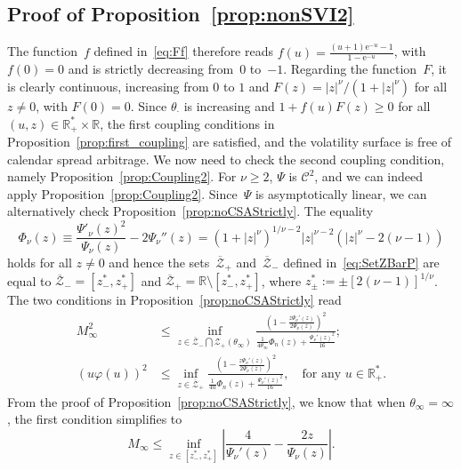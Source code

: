 \documentclass{amsart}[11pt]
\numberwithin{equation}{section}
\theoremstyle{definition}
\newcommand{\RR}{\mathbb{R}}
\newcommand{\E}{\mathrm{e}}
\newcommand{\Zz}{\mathcal{Z}}
\begin{document}
\subsection{Proof of Proposition~\ref{prop:nonSVI2}}\label{sec:prop:nonSVI2}
The function~$f$ defined in~\eqref{eq:Ff} therefore reads $f(u) = \frac{(u+1) \E^{-u} - 1}{1-\E^{-u}}$, 
with $f(0)=0$
and is strictly decreasing from~$0$ to~$-1$.
Regarding the function~$F$, it is clearly continuous, increasing from $0$ to $1$ and 
$F(z)=|z|^\nu/\left(1+|z|^\nu\right)$ for all $z\ne 0$,
with $F(0)=0$.
Since $\theta_\cdot$ is increasing and $1+f(u)F(z)\geq 0$ for all $(u,z)\in\RR_+^*\times\RR$, the first coupling conditions in Proposition~\ref{prop:first_coupling} are satisfied, and the volatility surface is free of calendar spread arbitrage.
We now need to check the second coupling condition, namely Proposition~\ref{prop:Coupling2}. For $\nu\geq2$, $\Psi$ is $\mathcal{C}^2$, and we can indeed apply Proposition~\ref{prop:Coupling2}. 
Since~$\Psi$ is asymptotically linear, we can alternatively check Proposition~\ref{prop:noCSAStrictly}.
The equality 
\begin{equation}\label{eq:Phi}
\Phi_\nu(z)\equiv \frac{\Psi'_\nu(z)^2}{\Psi_\nu(z)}-2\Psi_\nu''(z) = 
\left(1+|z|^\nu\right)^{1/\nu-2}|z|^{\nu-2}\left(|z|^\nu-2(\nu-1)\right)
\end{equation}
holds for all $z\ne 0$ and hence the sets~$\overline{\Zz}_+$ and~$\overline{\Zz}_-$ 
defined in~\eqref{eq:SetZBarP} are equal to 
$\overline{\Zz}_-=[z_-^*,z_+^*]$
and $\overline{\Zz}_+=\RR\setminus [z_-^*,z_+^*]$,
where $z_\pm^*:=\pm [2(\nu-1)]^{1/\nu}$.
The two conditions in Proposition~\ref{prop:noCSAStrictly} read
\begin{align}
M_\infty^2 
& \displaystyle \leq \inf_{z \in \overline{\Zz}_- \bigcap \Zz_+(\theta_\infty)}
\frac{\left(1-\frac{z\Psi_\nu'(z)}{2\Psi_\nu(z)}\right)^2}
{\frac{1}{4 \theta_\infty} \Phi_n(z)+\frac{\Psi_\nu'(z)^{2}}{16}};\nonumber\\
(u \varphi(u))^2 
& \displaystyle \leq \inf_{z \in \overline{\Zz}_+} 
\frac{\left(1-\frac{z\Psi_\nu'(z)}{2\Psi_\nu(z)}\right)^2}
{\frac{1}{4 u} \Phi_n(z)+\frac{\Psi_\nu'(z)^{2}}{16}},
\quad\text{for any }u \in \RR_+^*.\label{eq:Ineq2}
\end{align}
From the proof of Proposition~\ref{prop:noCSAStrictly}, we know that when $\theta_\infty=\infty$, 
the first condition simplifies to
\begin{equation}\label{eq:Ineq1}
M_\infty \leq \inf_{z\in [z_-^*,z_+^*]}\left|\frac{4}{\Psi_\nu'(z)}-\frac{2z}{\Psi_\nu(z)}\right|.
\end{equation}
\end{document}

